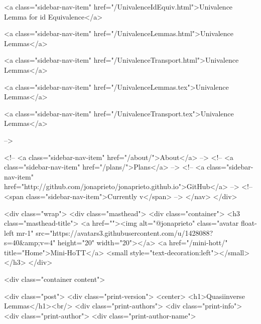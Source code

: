       
    
      
        
          <a class="sidebar-nav-item" href="/UnivalenceIdEquiv.html">Univalence Lemma for id Equivalence</a>
        
      
    
      
        
          <a class="sidebar-nav-item" href="/UnivalenceLemmas.html">Univalence Lemmas</a>
        
      
    
      
        
          <a class="sidebar-nav-item" href="/UnivalenceTransport.html">Univalence Lemmas</a>
        
      
    
      
        
          <a class="sidebar-nav-item" href="/UnivalenceLemmas.tex">Univalence Lemmas</a>
        
      
    
      
        
          <a class="sidebar-nav-item" href="/UnivalenceTransport.tex">Univalence Lemmas</a>
        
      
     -->

    <!-- <a class="sidebar-nav-item" href="/about/">About</a> -->
    <!-- <a class="sidebar-nav-item" href="/plans/">Plans</a> -->
    <!-- <a class="sidebar-nav-item" href="http://github.com/jonaprieto/jonaprieto.github.io">GitHub</a> -->
    <!-- <span class="sidebar-nav-item">Currently v</span> -->
  </nav>
</div>

    <div class="wrap">
      <div class="masthead">
        <div class="container">
          <h3 class="masthead-title">
            <a href=""><img alt="@jonaprieto" class="avatar float-left mr-1" src="https://avatars3.githubusercontent.com/u/1428088?s=40&amp;v=4" height="20" width="20"></a>
            <a href="/mini-hott/" title="Home">Mini-HoTT</a>
            <small style="text-decoration:left"></small>
          </h3>
        </div>
      
      <div class="container content">
        







<div class="post">
  <div class="print-version">
    <center>
      <h1>Quasiinverse Lemmas</h1><br/>
        <div class="print-authors">
          <div class="print-info">
            <div class="print-author">
              <div class="print-author-name">
                
